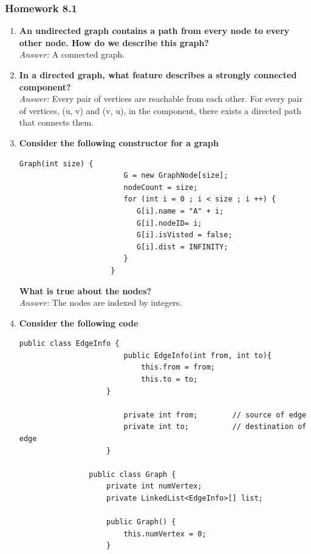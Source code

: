 \documentclass[10pt]{article}
\begin{document}
\subsubsection{Homework 8.1}
\begin{enumerate}
    \item \textbf{An undirected graph contains a path from every node to every other node. How do we describe this graph?}\\
          \textit{Answer:} A connected graph.
    \item \textbf{In a directed graph, what feature describes a strongly connected component?}\\
          \textit{Answer:} Every pair of vertices are reachable from each other. For every pair of vertices, (u, v) and (v, u), in the component, there exists a directed path that connects them.
    \item \textbf{Consider the following constructor for a graph}\\
          \begin{lstlisting}[style=java]
                Graph(int size) {
                        G = new GraphNode[size];
                        nodeCount = size;
                        for (int i = 0 ; i < size ; i ++) {
                           G[i].name = "A" + i;
                           G[i].nodeID= i;
                           G[i].isVisted = false;
                           G[i].dist = INFINITY;
                        }
                     }
            \end{lstlisting}
          \textbf{What is true about the nodes?}\\
          \textit{Answer:} The nodes are indexed by integers.
    \item \textbf{Consider the following code}\\
          \begin{lstlisting}[style=java]
                public class EdgeInfo {
                        public EdgeInfo(int from, int to){
                            this.from = from;
                            this.to = to;
                    }

                        private int from;        // source of edge
                        private int to;          // destination of edge
                    }

                public class Graph {
                    private int numVertex;
                    private LinkedList<EdgeInfo>[] list;

                    public Graph() {
                        this.numVertex = 0;
                    }


\end{lstlisting}
\end{enumerate}
\end{document}
